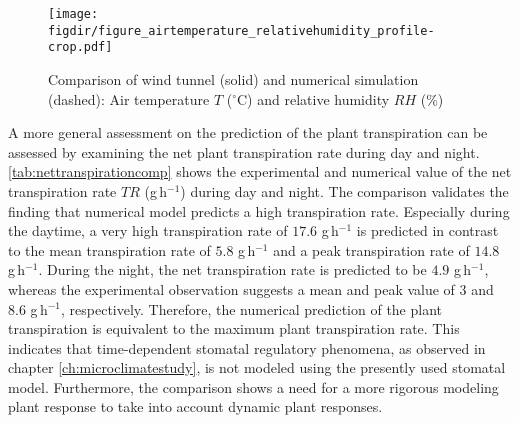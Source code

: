 \begin{figure}[t]
	\centering
	\texttt{[image: \\figdir/figure\_airtemperature\_relativehumidity\_profile-crop.pdf]}
	\caption{Comparison of wind tunnel (solid) and numerical simulation (dashed):  Air temperature $T$ ($^{\circ}$C) and  relative humidity $\mathit{RH}$ (\%)}
	\label{fig:figure_airtemperature_relativehumidity_profile2}
\end{figure}

A more general assessment on the prediction of the plant transpiration can be assessed by examining the net plant transpiration rate during day and night. \cref{tab:nettranspirationcomp} shows the experimental and numerical value of the net transpiration rate $\textit{TR}$ (g\,h$^{-1}$) during day and night. The comparison validates the finding that numerical model predicts a high transpiration rate. Especially during the daytime, a very high transpiration rate of $17.6$ g\,h$^{-1}$ is predicted in contrast to the mean transpiration rate of $5.8$ g\,h$^{-1}$ and a peak transpiration rate of $14.8$ g\,h$^{-1}$. During the night, the net transpiration rate is predicted to be $4.9$ g\,h$^{-1}$, whereas the experimental observation suggests a mean and peak value of $3$ and $8.6$ g\,h$^{-1}$, respectively. Therefore, the numerical prediction of the plant transpiration is equivalent to the maximum plant transpiration rate. This indicates that time-dependent stomatal regulatory phenomena, as observed in chapter \ref{ch:microclimatestudy}, is not modeled using the presently used stomatal model. Furthermore, the comparison shows a need for a more rigorous modeling plant response to take into account dynamic plant responses.


